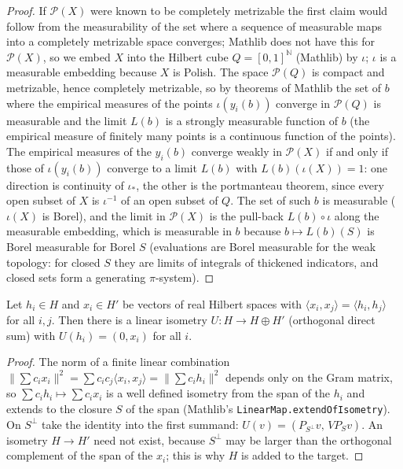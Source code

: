 \begin{proof}
  \leanok
If $\mathcal P(X)$ were known to be completely metrizable the first claim would follow from the measurability of the set where a sequence of measurable maps into a completely metrizable space converges; Mathlib does not have this for $\mathcal P(X)$, so we embed $X$ into the Hilbert cube $Q=[0,1]^{\mathbb N}$ (Mathlib) by $\iota$; $\iota$ is a measurable embedding because $X$ is Polish. The space $\mathcal P(Q)$ is compact and metrizable, hence completely metrizable, so by theorems of Mathlib the set of $b$ where the empirical measures of the points $\iota(y_i(b))$ converge in $\mathcal P(Q)$ is measurable and the limit $L(b)$ is a strongly measurable function of $b$ (the empirical measure of finitely many points is a continuous function of the points). The empirical measures of the $y_i(b)$ converge weakly in $\mathcal P(X)$ if and only if those of $\iota(y_i(b))$ converge to a limit $L(b)$ with $L(b)(\iota(X))=1$: one direction is continuity of $\iota_*$, the other is the portmanteau theorem, since every open subset of $X$ is $\iota^{-1}$ of an open subset of $Q$. The set of such $b$ is measurable ($\iota(X)$ is Borel), and the limit in $\mathcal P(X)$ is the pull-back $L(b)\circ\iota$ along the measurable embedding, which is measurable in $b$ because $b\mapsto L(b)(S)$ is Borel measurable for Borel $S$ (evaluations are Borel measurable for the weak topology: for closed $S$ they are limits of integrals of thickened indicators, and closed sets form a generating $\pi$-system).
\end{proof}

\begin{lemma}\label{lem:sg:gram-isometry}
  \leanok
Let $h_i\in H$ and $x_i\in H'$ be vectors of real Hilbert spaces with $\langle x_i,x_j\rangle=\langle h_i,h_j\rangle$ for all $i,j$. Then there is a linear isometry $U:H\to H\oplus H'$ (orthogonal direct sum) with $U(h_i)=(0,x_i)$ for all $i$.
\end{lemma}

\begin{proof}
  \leanok
The norm of a finite linear combination $\|\sum c_ix_i\|^2=\sum c_ic_j\langle x_i,x_j\rangle=\|\sum c_ih_i\|^2$ depends only on the Gram matrix, so $\sum c_ih_i\mapsto\sum c_ix_i$ is a well defined isometry from the span of the $h_i$ and extends to the closure $S$ of the span (Mathlib's \texttt{LinearMap.extendOfIsometry}). On $S^\perp$ take the identity into the first summand: $U(v)=(P_{S^\perp}v,\,V P_Sv)$. An isometry $H\to H'$ need not exist, because $S^\perp$ may be larger than the orthogonal complement of the span of the $x_i$; this is why $H$ is added to the target.
\end{proof}

